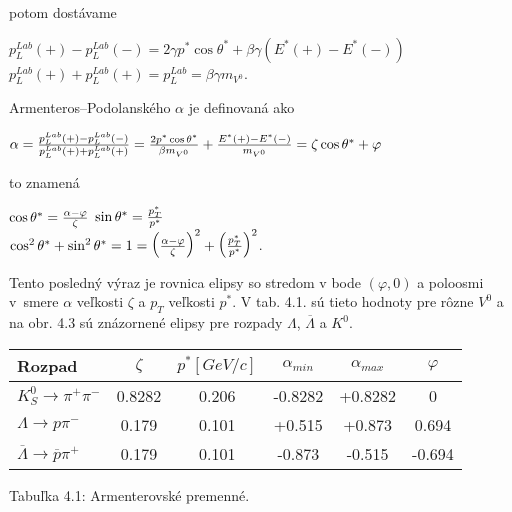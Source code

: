 potom dostávame 
\begin{center}
  $p_{L}^{Lab}(+)-p_{L}^{Lab}(-)=2\gamma p^{*}\cos\theta^{*} +\beta\gamma
(E^{*}(+)-E^{*}(-)) $ \\
  $p_{L}^{Lab}(+)+p_{L}^{Lab}(+)= p_{L}^{Lab}=\beta\gamma m_{{V}^{0}}$.
\end{center}
Armenteros--Podolanského $\alpha$ je definovaná ako
\begin{center}
 $\alpha={\Large\frac{p_{L}^{Lab}(+)-p_{L}^{Lab}(-)}{p_{L}^{Lab}(+)+p_{L}^{Lab}(+)}}
= {\Large\frac{2p^{*}\cos\theta^{*}}{\beta m_{{V}^{0}}}}+{\Large\frac{E^{*}(+)-E^{*}(-)}
{m_{{V}^{0}}}} = \zeta\cos\theta^{*} + \varphi$
\end{center}
to znamená 
\begin{center}
  $\cos\theta^{*}={\Large\frac{\alpha-\varphi}{\zeta}}$ \hspace{1cm} $\sin\theta^{*}
= {\Large\frac{p_{T}^{*}}{p^{*}}}$ \\
  $\cos^{2}\theta^{*} + \sin^{2}\theta^{*} =1={\Large \bigl(\frac{\alpha-\varphi}
{\zeta} \bigr)^{2}} + {\Large\bigl(\frac{p_{T}^{*}}{p^{*}} \bigr)^{2}}$.
\end{center}
Tento posledný výraz je rovnica elipsy so stredom v bode $(\varphi,0)$ a
poloosmi v~smere $\alpha$ veľkosti $\zeta$ a $p_{T}$ veľkosti $p^{*}$. V tab.
4.1. sú tieto hodnoty pre rôzne $V^{0}$ a na obr. 4.3  sú znázornené elipsy
pre rozpady $\Lambda$, $\overline{\Lambda}$ a $K^{0}$.

\vspace*{0.5cm}
\begin{tabular}{|l|c|c|c|c|c|}
\hline
Rozpad & $\zeta$ & $p^{*}[GeV/c]$ & $\alpha_{min}$ & $\alpha_{max}$ & 
$\varphi$ \\ \hline
$K^{0}_{S}\rightarrow\pi^{+}\pi^{-}$ & 0.8282 & 0.206 & -0.8282 & +0.8282 &
0 \\
$\Lambda\rightarrow p\pi^{-}$ & 0.179 & 0.101 & +0.515 & +0.873 & 0.694 \\
$\overline{\Lambda}\rightarrow \overline{p}\pi^{+}$ & 0.179 & 0.101 &
-0.873 & -0.515 & -0.694 \\ \hline  
\end{tabular}
\begin{center}
  Tabuľka 4.1: Armenterovské premenné.
\end{center}
